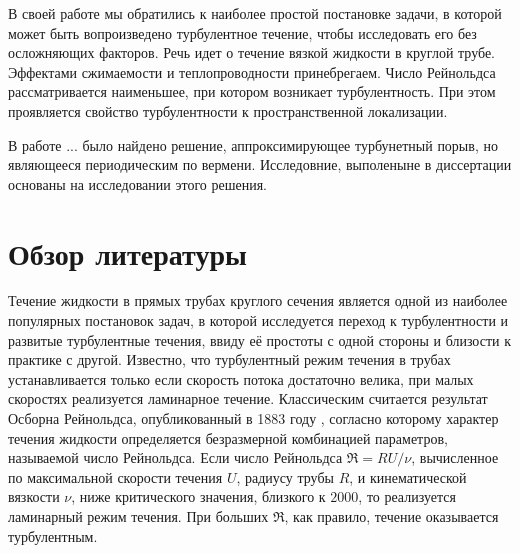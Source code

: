 В своей работе мы обратились к наиболее простой постановке задачи, в которой может быть вопроизведено турбулентное течение, чтобы исследовать его без осложняющих факторов. Речь идет о течение вязкой жидкости в круглой трубе. Эффектами сжимаемости и теплопроводности принебрегаем. Число Рейнольдса рассматривается наименьшее, при котором возникает турбулентность. При этом проявляется свойство турбулентности к пространственной локализации. 


В работе ... было найдено решение, аппроксимирующее турбунетный порыв, но являющееся периодическим по вермени. Исследовние, выполеныне в диссертации основаны на исследовании этого решения. 



\section{Обзор литературы}


Течение жидкости в прямых трубах круглого сечения является одной из наиболее популярных постановок задач, в которой исследуется переход к турбулентности и развитые турбулентные течения, ввиду её простоты с одной стороны и близости к практике с другой. Известно, что турбулентный режим течения в трубах устанавливается только если скорость потока достаточно велика, при малых скоростях реализуется ламинарное течение. Классическим считается результат Осборна Рейнольдса, опубликованный в 1883 году \cite{Reynolds1883}, согласно которому характер течения жидкости определяется безразмерной комбинацией параметров, называемой число Рейнольдса. Если число Рейнольдса $\Re = RU/\nu$, вычисленное по максимальной скорости течения $U$, радиусу трубы $R$, и кинематической вязкости $\nu$, ниже критического значения, близкого к $2000$, то реализуется ламинарный режим течения. При больших $\Re$, как правило, течение оказывается турбулентным. 


